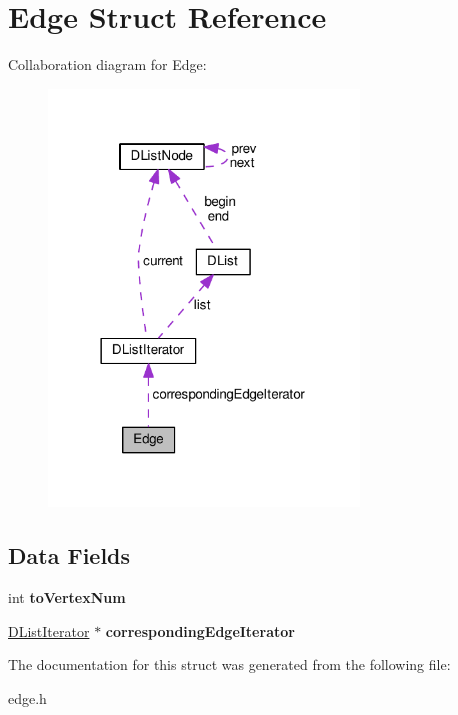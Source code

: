 \hypertarget{struct_edge}{}\section{Edge Struct Reference}
\label{struct_edge}


Collaboration diagram for Edge\+:
\nopagebreak
\begin{figure}[H]
\begin{center}
\leavevmode
\includegraphics[width=234pt]{struct_edge__coll__graph}
\end{center}
\end{figure}
\subsection*{Data Fields}
\begin{DoxyCompactItemize}
\item 
int {\bfseries to\+Vertex\+Num}\hypertarget{struct_edge_a1a23a3c73c035f1302ab006c21b836d5}{}\label{struct_edge_a1a23a3c73c035f1302ab006c21b836d5}

\item 
\hyperlink{struct_d_list_iterator}{D\+List\+Iterator} $\ast$ {\bfseries corresponding\+Edge\+Iterator}\hypertarget{struct_edge_a2f5f3526efe6a35b6b6429c2516be24d}{}\label{struct_edge_a2f5f3526efe6a35b6b6429c2516be24d}

\end{DoxyCompactItemize}


The documentation for this struct was generated from the following file\+:\begin{DoxyCompactItemize}
\item 
edge.\+h\end{DoxyCompactItemize}
